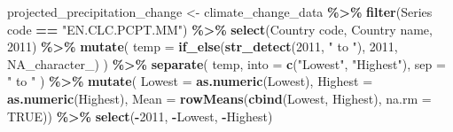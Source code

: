 \documentclass[
]{book}
\newenvironment{Shaded}{\begin{snugshade}}{\end{snugshade}}
\newcommand{\AttributeTok}[1]{\textcolor[rgb]{0.13,0.29,0.53}{#1}}
\newcommand{\ConstantTok}[1]{\textcolor[rgb]{0.56,0.35,0.01}{#1}}
\newcommand{\FunctionTok}[1]{\textcolor[rgb]{0.13,0.29,0.53}{\textbf{#1}}}
\newcommand{\NormalTok}[1]{#1}
\newcommand{\OtherTok}[1]{\textcolor[rgb]{0.56,0.35,0.01}{#1}}
\newcommand{\SpecialCharTok}[1]{\textcolor[rgb]{0.81,0.36,0.00}{\textbf{#1}}}
\newcommand{\StringTok}[1]{\textcolor[rgb]{0.31,0.60,0.02}{#1}}
\begin{document}
\begin{Shaded}
\begin{Highlighting}[]
\NormalTok{projected\_precipitation\_change }\OtherTok{\textless{}{-}}\NormalTok{ climate\_change\_data }\SpecialCharTok{\%\textgreater{}\%} 
  \FunctionTok{filter}\NormalTok{(}\StringTok{\textasciigrave{}}\AttributeTok{Series code}\StringTok{\textasciigrave{}} \SpecialCharTok{==} \StringTok{"EN.CLC.PCPT.MM"}\NormalTok{) }\SpecialCharTok{\%\textgreater{}\%} 
  \FunctionTok{select}\NormalTok{(}\StringTok{\textasciigrave{}}\AttributeTok{Country code}\StringTok{\textasciigrave{}}\NormalTok{, }\StringTok{\textasciigrave{}}\AttributeTok{Country name}\StringTok{\textasciigrave{}}\NormalTok{, }\StringTok{\textasciigrave{}}\AttributeTok{2011}\StringTok{\textasciigrave{}}\NormalTok{) }\SpecialCharTok{\%\textgreater{}\%} 
  \FunctionTok{mutate}\NormalTok{(}
    \AttributeTok{temp =} \FunctionTok{if\_else}\NormalTok{(}\FunctionTok{str\_detect}\NormalTok{(}\StringTok{\textasciigrave{}}\AttributeTok{2011}\StringTok{\textasciigrave{}}\NormalTok{, }\StringTok{" to "}\NormalTok{),}
                   \StringTok{\textasciigrave{}}\AttributeTok{2011}\StringTok{\textasciigrave{}}\NormalTok{,}
                   \ConstantTok{NA\_character\_}\NormalTok{)}
\NormalTok{  ) }\SpecialCharTok{\%\textgreater{}\%}
  \FunctionTok{separate}\NormalTok{(}
\NormalTok{    temp,}
    \AttributeTok{into =} \FunctionTok{c}\NormalTok{(}\StringTok{"Lowest"}\NormalTok{, }\StringTok{"Highest"}\NormalTok{),}
    \AttributeTok{sep =} \StringTok{" to "}
\NormalTok{  ) }\SpecialCharTok{\%\textgreater{}\%} 
  \FunctionTok{mutate}\NormalTok{(}
    \AttributeTok{Lowest =} \FunctionTok{as.numeric}\NormalTok{(Lowest),}
    \AttributeTok{Highest   =} \FunctionTok{as.numeric}\NormalTok{(Highest),}
    \AttributeTok{Mean    =} \FunctionTok{rowMeans}\NormalTok{(}\FunctionTok{cbind}\NormalTok{(Lowest, Highest), }\AttributeTok{na.rm =} \ConstantTok{TRUE}\NormalTok{)) }\SpecialCharTok{\%\textgreater{}\%}  
  \FunctionTok{select}\NormalTok{(}\SpecialCharTok{{-}}\StringTok{\textasciigrave{}}\AttributeTok{2011}\StringTok{\textasciigrave{}}\NormalTok{, }\SpecialCharTok{{-}}\NormalTok{Lowest, }\SpecialCharTok{{-}}\NormalTok{Highest)}


\end{Highlighting}
\end{Shaded}
\end{document}
